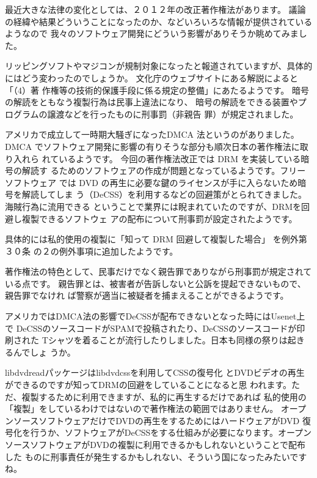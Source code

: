 \documentclass[mingoth,a4paper]{jsarticle}
\begin{document}
最近大きな法律の変化としては、２０１２年の改正著作権法があります。
議論の経緯や結果どういうことになったのか、などいろいろな情報が提供されているようなので
我々のソフトウェア開発にどういう影響がありそうか眺めてみました。

リッピングソフトやマジコンが規制対象になったと報道されていますが、具体的
にはどう変わったのでしょうか。
文化庁のウェブサイトにある解説\cite{bunka-chosaku2012}によると「（4）著
作権等の技術的保護手段に係る規定の整備」にあたるようです。
暗号の解読をともなう複製行為は民事上違法になり、
暗号の解読をできる装置やプログラムの譲渡などを行ったものに刑事罰（非親告
罪）が規定されました。

アメリカで成立して一時期大騒ぎになったDMCA 法というのがありました。 DMCA
でソフトウェア開発に影響の有りそうな部分も順次日本の著作権法に取り入れら
れているようです。 今回の著作権法改正では DRM を実装している暗号の解読す
るためのソフトウェアの作成が問題となっているようです。フリーソフトウェア
では DVD の再生に必要な鍵のライセンスが手に入らないため暗号を解読してしま
う（DeCSS）を利用するなどの回避策がとられてきました。海賊行為に流用できる
ということで業界には睨まれていたのですが、DRMを回避し複製できるソフトウェ
アの配布について刑事罰が設定されたようです。

具体的には私的使用の複製に「知って DRM 回避して複製した場合」 を例外第３０条
の２の例外事項に追加したようです。

著作権法の特色として、民事だけでなく親告罪でありながら刑事罰が規定されている点です。
親告罪とは、被害者が告訴しないと公訴を提起できないもので、親告罪でなけれ
ば警察が適当に被疑者を捕まえることができるようです。

アメリカではDMCA法の影響でDeCSSが配布できないとなった時にはUsenet上で
DeCSSのソースコードがSPAMで投稿されたり、DeCSSのソースコードが印刷された
Tシャツを着ることが流行したりしました。日本も同様の祭りは起きるんでしょ
うか。

libdvdreadパッケージは\cite{libdvdread-css}libdvdcssを利用してCSSの復号化
とDVDビデオの再生ができるのですが知ってDRMの回避をしていることになると思
われます。ただ、複製するために利用できますが、私的に再生するだけであれば
私的使用の「複製」をしているわけではないので著作権法の範囲ではありません。
オープンソースソフトウェアだけでDVDの再生をするためにはハードウェアがDVD
復号化を行うか、ソフトウェアがDeCSSをする仕組みが必要になります。オープン
ソースソフトウェアがDVDの複製に利用できるかもしれないということで配布した
ものに刑事責任が発生するかもしれない、そういう国になったみたいですね。
\end{document}
